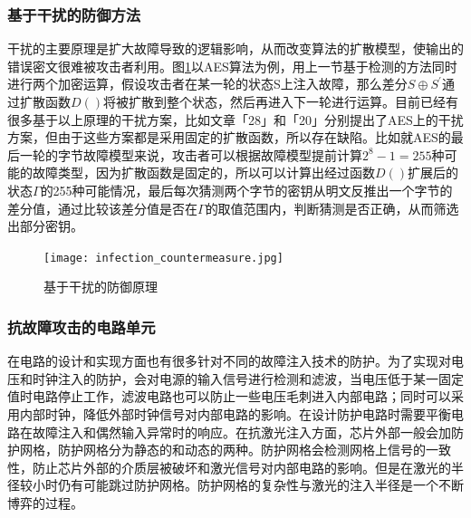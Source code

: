 \documentclass[a4paper,12pt]{article}
\begin{document}
\begin{CJK}{UTF8}{gkai}
\subsubsection{基于干扰的防御方法}
干扰的主要原理是扩大故障导致的逻辑影响，从而改变算法的扩散模型，使输出的错误密文很难被攻击者利用。图\ref{infection_countermeasure}以AES算法为例，用上一节基于检测的方法同时进行两个加密运算，假设攻击者在某一轮的状态S上注入故障，那么差分$S \oplus S^'$通过扩散函数$D()$将被扩散到整个状态，然后再进入下一轮进行运算。目前已经有很多基于以上原理的干扰方案，比如文章「28」和「20」分别提出了AES上的干扰方案，但由于这些方案都是采用固定的扩散函数，所以存在缺陷。比如就AES的最后一轮的字节故障模型来说，攻击者可以根据故障模型提前计算$2^8-1=255$种可能的故障类型，因为扩散函数是固定的，所以可以计算出经过函数$D()$扩展后的状态$\Gamma$的255种可能情况，最后每次猜测两个字节的密钥从明文反推出一个字节的差分值，通过比较该差分值是否在$\Gamma$的取值范围内，判断猜测是否正确，从而筛选出部分密钥。

\begin{figure}
\centering
\caption{基于干扰的防御原理}
\texttt{[image: infection\_countermeasure.jpg]}
\label{infection_countermeasure}
\end{figure}

\subsubsection{抗故障攻击的电路单元}
在电路的设计和实现方面也有很多针对不同的故障注入技术的防护。为了实现对电压和时钟注入的防护，会对电源的输入信号进行检测和滤波，当电压低于某一固定值时电路停止工作，滤波电路也可以防止一些电压毛刺进入内部电路；同时可以采用内部时钟，降低外部时钟信号对内部电路的影响。在设计防护电路时需要平衡电路在故障注入和偶然输入异常时的响应。在抗激光注入方面，芯片外部一般会加防护网格，防护网格分为静态的和动态的两种。防护网格会检测网格上信号的一致性，防止芯片外部的介质层被破坏和激光信号对内部电路的影响。但是在激光的半径较小时仍有可能跳过防护网格。防护网格的复杂性与激光的注入半径是一个不断博弈的过程。
\end{CJK}
\end{document}

